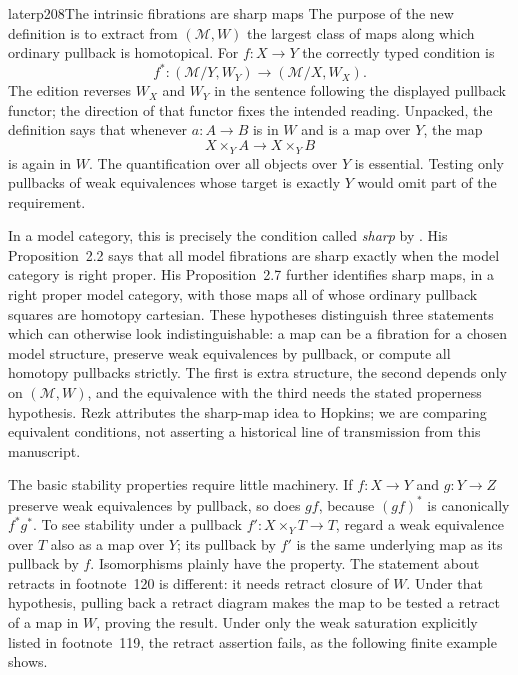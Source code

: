 \begin{dcomment}{later}{p208}{The intrinsic fibrations are sharp maps}
The purpose of the new definition is to extract from $(\mathcal M,W)$ the largest class of maps along which ordinary pullback is homotopical. For $f:X\to Y$ the correctly typed condition is
\[
 f^*:(\mathcal M/Y,W_Y)\longrightarrow(\mathcal M/X,W_X).
\]
The edition reverses $W_X$ and $W_Y$ in the sentence following the displayed pullback functor; the direction of that functor fixes the intended reading. Unpacked, the definition says that whenever $a:A\to B$ is in $W$ and is a map over $Y$, the map
\[
 X\times_Y A\longrightarrow X\times_Y B
\]
is again in $W$. The quantification over all objects over $Y$ is essential. Testing only pullbacks of weak equivalences whose target is exactly $Y$ would omit part of the requirement.

In a model category, this is precisely the condition called \emph{sharp} by \citet[\S2]{Rezk1998Sharp}. His Proposition~2.2 says that all model fibrations are sharp exactly when the model category is right proper. His Proposition~2.7 further identifies sharp maps, in a right proper model category, with those maps all of whose ordinary pullback squares are homotopy cartesian. These hypotheses distinguish three statements which can otherwise look indistinguishable: a map can be a fibration for a chosen model structure, preserve weak equivalences by pullback, or compute all homotopy pullbacks strictly. The first is extra structure, the second depends only on $(\mathcal M,W)$, and the equivalence with the third needs the stated properness hypothesis. Rezk attributes the sharp-map idea to Hopkins; we are comparing equivalent conditions, not asserting a historical line of transmission from this manuscript.

The basic stability properties require little machinery. If $f:X\to Y$ and $g:Y\to Z$ preserve weak equivalences by pullback, so does $gf$, because $(gf)^*$ is canonically $f^*g^*$. To see stability under a pullback $f':X\times_Y T\to T$, regard a weak equivalence over $T$ also as a map over $Y$; its pullback by $f'$ is the same underlying map as its pullback by $f$. Isomorphisms plainly have the property. The statement about retracts in footnote~120 is different: it needs retract closure of $W$. Under that hypothesis, pulling back a retract diagram makes the map to be tested a retract of a map in $W$, proving the result. Under only the weak saturation explicitly listed in footnote~119, the retract assertion fails, as the following finite example shows.
\end{dcomment}

